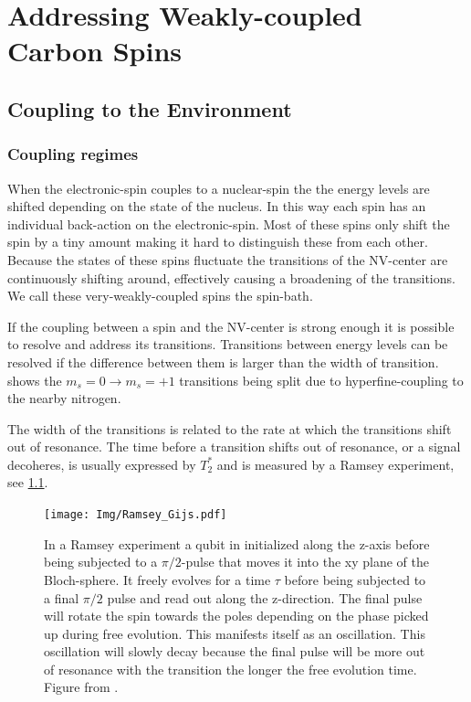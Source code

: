 
\chapter{Addressing Weakly-coupled Carbon Spins}

\section{Coupling to the Environment}

\subsection{Coupling regimes}
When the electronic-spin couples to a nuclear-spin the the energy levels are shifted depending on the state of the nucleus.
In this way each spin has an individual back-action on the electronic-spin.
Most of these spins only shift the spin by a tiny amount making it hard to distinguish these from each other.
Because the states of these spins fluctuate the transitions of the NV-center are continuously shifting around, effectively causing a broadening of the transitions.
We call these very-weakly-coupled spins the spin-bath.

If the coupling between a spin and the NV-center is strong enough it is possible to resolve and address its transitions.
Transitions between energy levels can be resolved if the difference between them is larger than the width of transition.
 shows the $m_s =0 \rightarrow m_s=+1$ transitions being split due to hyperfine-coupling to the nearby nitrogen.

The width of the transitions is related to the rate at which the transitions shift out of resonance.
The time before a transition shifts out of resonance, or a signal decoheres, is usually expressed by $T_2^*$ and is measured by a Ramsey experiment, see \cref{fig:Ramsey_gijs}.

\begin{figure}[htbp]
    \centering
    \texttt{[image: Img/Ramsey\_Gijs.pdf]}
    \caption{In a Ramsey experiment a qubit in initialized along the z-axis before being subjected to a $\pi/2$-pulse that moves it into the xy plane of the Bloch-sphere. It freely evolves for a time $\tau$ before being subjected to a final $\pi/2$ pulse and read out along the z-direction.
The final pulse will rotate the spin towards the poles depending on the phase picked up during free evolution. This manifests itself as an oscillation. This oscillation will slowly decay because the final pulse will be more out of resonance with the transition the longer the free evolution time. Figure from \citep{Lange2012Quantum}.}
    \label{fig:Ramsey_gijs}
\end{figure}

